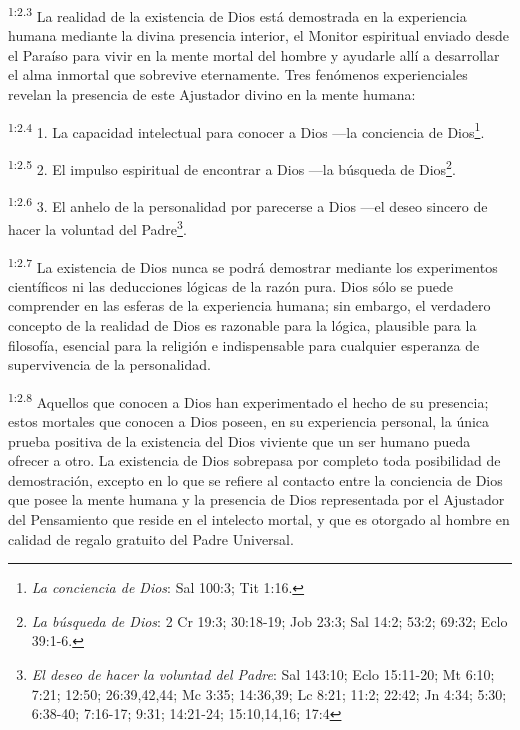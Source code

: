 \par
\textsuperscript{1:2.3} La realidad de la existencia de Dios está demostrada en la experiencia humana mediante la divina presencia interior, el Monitor espiritual enviado desde el Paraíso para vivir en la mente mortal del hombre y ayudarle allí a desarrollar el alma inmortal que sobrevive eternamente. Tres fenómenos experienciales revelan la presencia de este Ajustador divino en la mente humana:

\par
\textsuperscript{1:2.4} 1. La capacidad intelectual para conocer a Dios ---la conciencia de Dios\footnote{\textit{La conciencia de Dios}: Sal 100:3; Tit 1:16.}.

\par
\textsuperscript{1:2.5} 2. El impulso espiritual de encontrar a Dios ---la búsqueda de Dios\footnote{\textit{La búsqueda de Dios}: 2 Cr 19:3; 30:18-19; Job 23:3; Sal 14:2; 53:2; 69:32; Eclo 39:1-6.}.

\par
\textsuperscript{1:2.6} 3. El anhelo de la personalidad por parecerse a Dios ---el deseo sincero de hacer la voluntad del Padre\footnote{\textit{El deseo de hacer la voluntad del Padre}: Sal 143:10; Eclo 15:11-20; Mt 6:10; 7:21; 12:50; 26:39,42,44; Mc 3:35; 14:36,39; Lc 8:21; 11:2; 22:42; Jn 4:34; 5:30; 6:38-40; 7:16-17; 9:31; 14:21-24; 15:10,14,16; 17:4}.

\par
\textsuperscript{1:2.7} La existencia de Dios nunca se podrá demostrar mediante los experimentos científicos ni las deducciones lógicas de la razón pura. Dios sólo se puede comprender en las esferas de la experiencia humana; sin embargo, el verdadero concepto de la realidad de Dios es razonable para la lógica, plausible para la filosofía, esencial para la religión e indispensable para cualquier esperanza de supervivencia de la personalidad.

\par
\textsuperscript{1:2.8} Aquellos que conocen a Dios han experimentado el hecho de su presencia; estos mortales que conocen a Dios poseen, en su experiencia personal, la única prueba positiva de la existencia del Dios viviente que un ser humano pueda ofrecer a otro. La existencia de Dios sobrepasa por completo toda posibilidad de demostración, excepto en lo que se refiere al contacto entre la conciencia de Dios que posee la mente humana y la presencia de Dios representada por el Ajustador del Pensamiento que reside en el intelecto mortal, y que es otorgado al hombre en calidad de regalo gratuito del Padre Universal.

